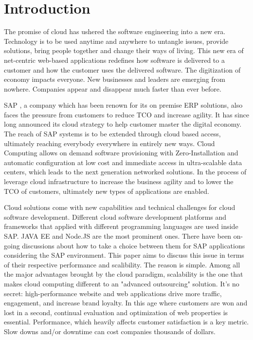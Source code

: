 \chapter{Introduction}
The promise of cloud has ushered the software engineering into a new era. Technology is to be used anytime and anywhere to untangle issues, provide solutions, bring people together and change their ways of living. This new era of net-centric web-based applications redefines how software is delivered to a customer and how the customer uses the delivered software. The digitization of economy impacts everyone. New businesses and leaders are emerging from nowhere. Companies appear and disappear much faster than ever before. 

SAP , a company which has been renown for its on premise ERP solutions, also faces the pressure from customers to reduce TCO and increase agility. It has since long announced its cloud strategy to help customer master the digital economy. The reach of SAP systems is to be extended through cloud based access, ultimately reaching everybody everywhere in entirely new ways. Cloud Computing allows on demand software provisioning with Zero-Installation and automatic configuration at low cost and immediate access in ultra-scalable data centers, which leads to the next generation networked solutions. In the process of leverage cloud infrastructure to increase the business agility and to lower the TCO of customers, ultimately new types of applications are enabled.

Cloud solutions come with new capabilities and technical challenges for cloud software development.  Different cloud software development platforms and frameworks that applied with different programming languages are used inside SAP. JAVA EE and Node.JS are the most prominent ones. There have been on-going discussions about how to  take a choice between them for SAP applications considering the SAP environment. This paper aims to discuss this issue in terms of their respective performance and scalibility. The reason is simple. Among all the major advantages brought by the cloud paradigm, scalability is the one that makes cloud computing different to an "advanced outsourcing" solution. It’s no secret: high-performance website and web applications drive more traffic, engagement, and increase brand loyalty. In this age where customers are won and lost in a second, continual evaluation and optimization of web properties is essential.  Performance, which heavily affects customer satisfaction is a key metric. Slow downs and/or downtime can cost companies thousands of dollars.\\





